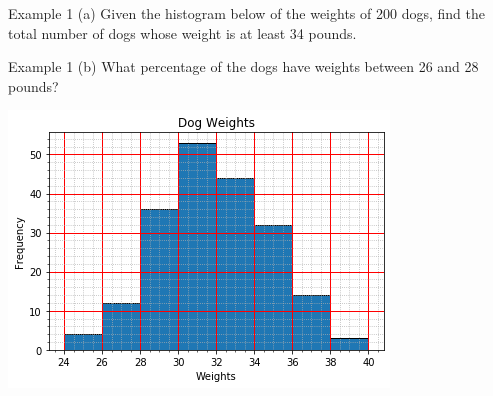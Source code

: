 \documentclass[t]{beamer}
\begin{document}
\begin{frame}{Example 1}
(a) \quad Given the histogram below of the weights of 200 dogs, find the total number of dogs whose weight is at least 34 pounds.	\newline\\
\begin{minipage}{0.7\textwidth}
\end{minipage}
\hspace{0.25cm}
\begin{minipage}{0.2\textwidth}
\end{minipage}
\end{frame}

\begin{frame}{Example 1}
(b) \quad What percentage of the dogs have weights between 26 and 28 pounds?	\newline\\
\begin{minipage}{0.7\textwidth}
\includegraphics[scale=0.55]{../Images/dog_weights_hist.png}
\end{minipage}
\hspace{0.25cm}
\begin{minipage}{0.2\textwidth}
 \\[10pt]
\end{minipage}
\end{frame}
\end{document}
